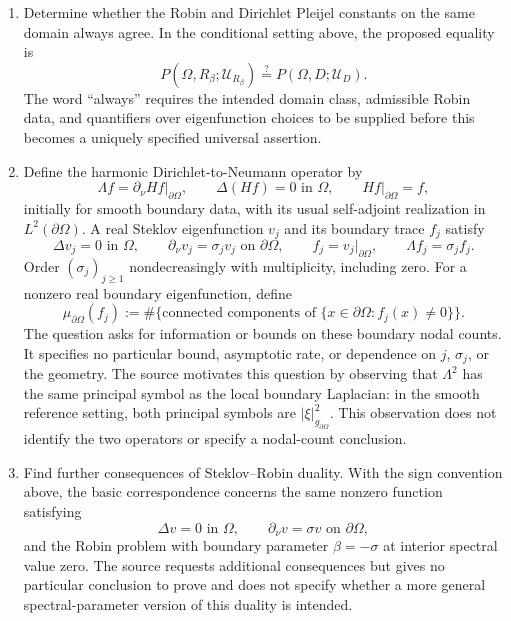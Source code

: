 \documentclass[11pt]{article}
\begin{document}
\begin{enumerate}
\item Determine whether the Robin and Dirichlet Pleijel constants on the same domain always agree. In the conditional setting above, the proposed equality is
\[
P(\Omega,R_\beta;\mathcal U_{R_\beta})
\stackrel{?}{=}
P(\Omega,D;\mathcal U_D).
\]
The word ``always'' requires the intended domain class, admissible Robin data, and quantifiers over eigenfunction choices to be supplied before this becomes a uniquely specified universal assertion.

\item Define the harmonic Dirichlet-to-Neumann operator by
\[
\Lambda f=\left.\partial_\nu Hf\right|_{\partial\Omega},
\qquad
\Delta(Hf)=0\text{ in }\Omega,
\qquad
\left.Hf\right|_{\partial\Omega}=f,
\]
initially for smooth boundary data, with its usual self-adjoint realization in \(L^2(\partial\Omega)\). A real Steklov eigenfunction \(v_j\) and its boundary trace \(f_j\) satisfy
\[
\Delta v_j=0\text{ in }\Omega,
\qquad
\partial_\nu v_j=\sigma_jv_j\text{ on }\partial\Omega,
\qquad
f_j=v_j|_{\partial\Omega},
\qquad
\Lambda f_j=\sigma_j f_j.
\]
Order \((\sigma_j)_{j\geq1}\) nondecreasingly with multiplicity, including zero. For a nonzero real boundary eigenfunction, define
\[
\mu_{\partial\Omega}(f_j)
:=\#\{\text{connected components of }
\{x\in\partial\Omega:f_j(x)\ne0\}\}.
\]
The question asks for information or bounds on these boundary nodal counts. It specifies no particular bound, asymptotic rate, or dependence on \(j\), \(\sigma_j\), or the geometry. The source motivates this question by observing that \(\Lambda^2\) has the same principal symbol as the local boundary Laplacian: in the smooth reference setting, both principal symbols are \(|\xi|_{g_{\partial\Omega}}^2\). This observation does not identify the two operators or specify a nodal-count conclusion.

\item Find further consequences of Steklov--Robin duality. With the sign convention above, the basic correspondence concerns the same nonzero function satisfying
\[
\Delta v=0\text{ in }\Omega,
\qquad
\partial_\nu v=\sigma v\text{ on }\partial\Omega,
\]
and the Robin problem with boundary parameter \(\beta=-\sigma\) at interior spectral value zero. The source requests additional consequences but gives no particular conclusion to prove and does not specify whether a more general spectral-parameter version of this duality is intended.
\end{enumerate}
\end{document}
